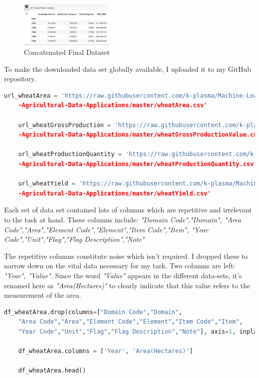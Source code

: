 \begin{figure}[h!]
	\centering
	\includegraphics[width=0.4\textwidth,height=\textheight,keepaspectratio]{fig/finaltable.png}
	\caption{Concatenated Final Dataset}
	\label{fig:CFD}
\end{figure}



To make the downloaded data set globally available, I uploaded it to my GitHub repository.\cite{adeyemo_2020}

\begin{lstlisting}[language=Python]
	url_wheatArea = 'https://raw.githubusercontent.com/k-plasma/Machine-Learning-Models-for
	-Agricultural-Data-Applications/master/wheatArea.csv'	
	
	url_wheatGrossProduction = 'https://raw.githubusercontent.com/k-plasma/Machine-Learning-Models-for
	-Agricultural-Data-Applications/master/wheatGrossProductionValue.csv'	
	
	url_wheatProductionQuantity = 'https://raw.githubusercontent.com/k-plasma/Machine-Learning-Models-for
	-Agricultural-Data-Applications/master/wheatProductionQuantity.csv'	
	
	url_wheatYield = 'https://raw.githubusercontent.com/k-plasma/Machine-Learning-Models-for
	-Agricultural-Data-Applications/master/wheatYield.csv'
\end{lstlisting}




Each set of data set contained lots of columns which are repetitive and irrelevant to the task at hand. These columns include: \textit{"Domain Code","Domain",
	"Area Code","Area","Element Code","Element","Item Code","Item",
	"Year Code","Unit","Flag","Flag Description","Note"}


The repetitive columns constitute noise which isn't required. I dropped these to narrow down on the vital data necessary for my task. Two columns are left: \textit{"Year", "Value".} Since the word \textit{"Value"} appears in the different data-sets, it's renamed here as \textit{"Area(Hectares)"} to clearly indicate that this value refers to the measurement of the area.


\begin{lstlisting}[language=Python]
	df_wheatArea.drop(columns=["Domain Code","Domain",
	"Area Code","Area","Element Code","Element","Item Code","Item",
	"Year Code","Unit","Flag","Flag Description","Note"], axis=1, inplace=True)
	
	df_wheatArea.columns = ['Year', 'Area(Hectares)'] 
	
	df_wheatArea.head()
\end{lstlisting}


